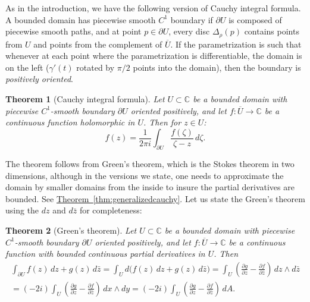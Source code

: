 \documentclass[12pt,openany]{book}
\newcommand{\C}{{\mathbb{C}}}
\newcommand{\myindex}[1]{#1\index{#1}}
\theoremstyle{plain}
\newtheorem{thm}{Theorem}[section]
\theoremstyle{remark}
\theoremstyle{definition}
\theoremstyle{exercise}
\theoremstyle{example}
\newcommand{\thmref}[1]{\hyperref[#1]{Theorem~\ref*{#1}}}
\begin{document}
As in the introduction, we have the following version of Cauchy integral
formula.  A bounded domain has piecewise smooth $C^1$ boundary if $\partial U$
is composed of piecewise smooth paths, and at point $p \in \partial U$,
every disc $\Delta_\rho(p)$ contains points from $U$ and points from the
complement of $\overline{U}$.  If the parametrization is such that
whenever at each point where the parametrization is differentiable,
the domain is on the left ($\gamma'(t)$ rotated by $\pi/2$ points into the
domain), then the boundary is \emph{\myindex{positively oriented}}.

\pagebreak[2]

\begin{thm}[Cauchy integral formula]
Let $U \subset \C$ be a bounded domain with piecewise $C^1$-smooth boundary
$\partial U$ oriented positively, and let
$f \colon \overline{U} \to \C$ be a continuous function
holomorphic in $U$.
Then for $z \in U$:
\begin{equation*}
f(z) =
\frac{1}{2\pi i}
\int_{\partial U}
\frac{f(\zeta)}{\zeta-z}
\,
d \zeta .
\end{equation*}
\end{thm}

The theorem follows from Green's theorem, which is the Stokes theorem
in two dimensions, although in the versions we state, one needs to
approximate the domain by smaller domains from the inside to insure
the partial derivatives are bounded.  See
\thmref{thm:generalizedcauchy}.  Let us state the Green's theorem using
the $dz$ and $d\bar{z}$ for completeness:

\begin{thm}[Green's theorem] \label{thm:greens}
Let $U \subset \C$ be a bounded domain with piecewise $C^1$-smooth boundary
$\partial U$ oriented positively, and let
$f \colon \overline{U} \to \C$ be a continuous function
with bounded continuous partial derivatives in $U$.
Then
\begin{multline*}
\int_{\partial U} f(z) \, dz + g(z) \, d\bar{z}
=
\int_{U} d \bigl( f(z) \, dz + g(z) \, d\bar{z} \bigr)
=
\int_{U}
\left(
\frac{\partial g}{\partial z}
-
\frac{\partial f}{\partial \bar{z}}
\right)
\, dz \wedge d\bar{z}
\\
=
(-2i)
\int_{U}
\left(
\frac{\partial g}{\partial z}
-
\frac{\partial f}{\partial \bar{z}}
\right)
\, dx \wedge dy 
=
(-2i)
\int_{U}
\left(
\frac{\partial g}{\partial z}
-
\frac{\partial f}{\partial \bar{z}}
\right)
\, dA.
\end{multline*}
\end{thm}
\end{document}
